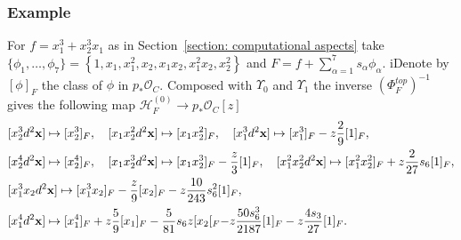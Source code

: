 \documentclass[12pt,a4paper]{amsart}
\newcommand{\bx}{{\bf x}}
\def\H{{\mathcal H}}
\def\O{{\mathcal O}}
\newcommand{\p}{{\partial}}
\newcommand{\<}{\left<}
\renewcommand{\>}{\right>}
\numberwithin{equation}{section}
\begin{document}
\subsubsection{Example}
For $f = x_ 1^3 + x_ 2^3 x_ 1$ as in Section~\ref{section: computational aspects} take $\{ \phi_1,\dots, \phi_7 \} = \left\{1, x_ 1, x_ 1^2, x_ 2, x_ 1 x_ 2, x_ 1^2 x_ 2, x_ 2^2 \right\}$ and $F = f + \sum_{\alpha=1}^7 s_\alpha \phi_\alpha$.
iDenote by $[\phi ]_F$ the class of $\phi$ in $p_\ast \O_C$. Composed with $\Upsilon_0$ and $\Upsilon_1$ the inverse $(\Phi_F^{top})^{-1}$ gives the following map $\H_F^{(0)} \to p_\ast \O_C[z]$
\begin{align*}
    & [x_ 2^3 d^2\bx] \mapsto [x_ 2^3 ]_F, \quad  [x_1x_ 2^2 d^2\bx] \mapsto [x_1x_ 2^2]_F, \quad  [x_ 1^3 d^2\bx] \mapsto  [x_ 1^3]_F - z \frac {2} {9}[1]_F ,
    \\
    & [x_ 2^4 d^2\bx] \mapsto [x_ 2^4]_F,
    \quad
    [x_ 1 x_ 2^3 d^2\bx] \mapsto [x_ 1 x_ 2^3]_F - \frac{z}{3}[1]_F,
    \quad
    [x_ 1^2 x_ 2^2 d^2\bx] \mapsto  [x_ 1^2 x_ 2^2]_F +  z \frac{2}{27} s_6[1]_F,
    \\
    & [x_ 1^3 x_ 2 d^2\bx] \mapsto  [x_1^3 x_2 ]_F - \frac {z} {9} [x_ 2]_F -  z \frac{10}{243} s_6^2[1]_F,
    \\
    & [x_ 1^4 d^2 \bx] \mapsto  [x_ 1^4]_F + z \frac {5} {9}[x_ 1]_F - \frac{5}{81} s_6 z [x_2[_F - z \frac{50 s_6^3 }{2187}[1]_F - z \frac{4 s_3}{27}[1]_F.
\end{align*}
\end{document}
